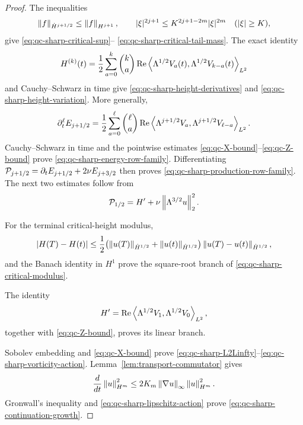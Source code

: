 {\begin{proof}
The inequalities
\[
 \left\lVert f\right\rVert_{\dot H^{j+1/2}}\le\left\lVert f\right\rVert_{H^{j+1}},
 \qquad
 |\xi|^{2j+1}\le K^{2j+1-2m}|\xi|^{2m}
 \quad(|\xi|\ge K),
\]
give \eqref{eq:qc-sharp-critical-sup}--%
\eqref{eq:qc-sharp-critical-tail-mass}.  The exact identity
\[
 H^{(k)}(t)=\frac12\sum_{a=0}^{k}\binom ka
 \operatorname{Re}\left\langle \Lambda^{1/2}V_a(t),\Lambda^{1/2}V_{k-a}(t)\right\rangle_{L^2}
\]
and Cauchy--Schwarz in time give
\eqref{eq:qc-sharp-height-derivatives} and
\eqref{eq:qc-sharp-height-variation}.  More generally,
\[
 \partial_t^\ell E_{j+1/2}
 =\frac12\sum_{a=0}^{\ell}\binom\ell a
 \operatorname{Re}\left\langle \Lambda^{j+1/2}V_a,\Lambda^{j+1/2}V_{\ell-a}\right\rangle_{L^2}.
\]
Cauchy--Schwarz in time and the pointwise estimates
\eqref{eq:qc-X-bound}--\eqref{eq:qc-Z-bound} prove
\eqref{eq:qc-sharp-energy-row-family}.  Differentiating
\(\mathcal P_{j+1/2}=\partial_tE_{j+1/2}+2\nu E_{j+3/2}\)
then proves \eqref{eq:qc-sharp-production-row-family}.  The next two
estimates follow from
\[
 \mathcal P_{1/2}=H'+\nu\left\lVert \Lambda^{3/2}u\right\rVert_2^2.
\]
\begin{samepage}
For the terminal critical-height modulus,
\[
 |H(T)-H(t)|
 \le\frac12\bigl(
 \left\lVert u(T)\right\rVert_{\dot H^{1/2}}+\left\lVert u(t)\right\rVert_{\dot H^{1/2}}
 \bigr)\left\lVert u(T)-u(t)\right\rVert_{\dot H^{1/2}},
\]
and the Banach identity in \(H^1\) prove the square-root branch of
\eqref{eq:qc-sharp-critical-modulus}.
\par
\end{samepage}
The identity
\[
 H'=\operatorname{Re}
 \left\langle \Lambda^{1/2}V_1,\Lambda^{1/2}V_0\right\rangle_{L^2},
\]
together with \eqref{eq:qc-Z-bound}, proves its linear branch.

Sobolev embedding and \eqref{eq:qc-X-bound} prove
\eqref{eq:qc-sharp-L2Linfty}--\eqref{eq:qc-sharp-vorticity-action}.
Lemma~\ref{lem:transport-commutator} gives
\[
 \frac d{dt}\left\lVert u\right\rVert_{H^m}^2
 \le2K_m\left\lVert \nabla u\right\rVert_\infty\left\lVert u\right\rVert_{H^m}^2.
\]
Gronwall's inequality and \eqref{eq:qc-sharp-lipschitz-action} prove
\eqref{eq:qc-sharp-continuation-growth}.
\end{proof}
}
